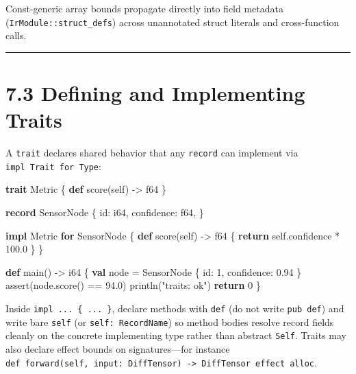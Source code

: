 \documentclass[
  english,
  oneside]{book}
\newenvironment{Shaded}{\begin{snugshade}}{\end{snugshade}}
\newcommand{\ControlFlowTok}[1]{\textcolor[rgb]{0.77,0.53,0.75}{\textbf{#1}}}
\newcommand{\DataTypeTok}[1]{\textcolor[rgb]{0.31,0.79,0.69}{#1}}
\newcommand{\DecValTok}[1]{\textcolor[rgb]{0.71,0.81,0.66}{#1}}
\newcommand{\FloatTok}[1]{\textcolor[rgb]{0.71,0.81,0.66}{#1}}
\newcommand{\FunctionTok}[1]{\textcolor[rgb]{0.86,0.86,0.67}{#1}}
\newcommand{\KeywordTok}[1]{\textcolor[rgb]{0.34,0.61,0.84}{\textbf{#1}}}
\newcommand{\NormalTok}[1]{\textcolor[rgb]{0.83,0.83,0.83}{#1}}
\newcommand{\OperatorTok}[1]{\textcolor[rgb]{0.83,0.83,0.83}{#1}}
\newcommand{\StringTok}[1]{\textcolor[rgb]{0.81,0.57,0.47}{#1}}
\begin{document}
Const-generic array bounds propagate directly into field metadata
(\texttt{IrModule::struct\_defs}) across unannotated struct literals and
cross-function calls.

\begin{center}\rule{0.5\linewidth}{0.5pt}\end{center}

\section{7.3 Defining and Implementing
Traits}\label{defining-and-implementing-traits}

A \texttt{trait} declares shared behavior that any \texttt{record} can
implement via \texttt{impl\ Trait\ for\ Type}:

\begin{Shaded}
\begin{Highlighting}[]
\KeywordTok{trait}\NormalTok{ Metric \{}
    \KeywordTok{def}\NormalTok{ score(self) }\OperatorTok{{-}\textgreater{}} \DataTypeTok{f64}
\NormalTok{\}}

\KeywordTok{record}\NormalTok{ SensorNode \{}
\NormalTok{    id: }\DataTypeTok{i64}\NormalTok{,}
\NormalTok{    confidence: }\DataTypeTok{f64}\NormalTok{,}
\NormalTok{\}}

\KeywordTok{impl}\NormalTok{ Metric }\ControlFlowTok{for}\NormalTok{ SensorNode \{}
    \KeywordTok{def}\NormalTok{ score(self) }\OperatorTok{{-}\textgreater{}} \DataTypeTok{f64}\NormalTok{ \{}
        \ControlFlowTok{return}\NormalTok{ self}\OperatorTok{.}\NormalTok{confidence }\OperatorTok{*} \FloatTok{100.0}
\NormalTok{    \}}
\NormalTok{\}}

\KeywordTok{def}\NormalTok{ main() }\OperatorTok{{-}\textgreater{}} \DataTypeTok{i64}\NormalTok{ \{}
    \KeywordTok{val}\NormalTok{ node }\OperatorTok{=}\NormalTok{ SensorNode \{ id: }\DecValTok{1}\NormalTok{, confidence: }\FloatTok{0.94}\NormalTok{ \}}
    \FunctionTok{assert}\NormalTok{(node}\OperatorTok{.}\NormalTok{score() }\OperatorTok{==} \FloatTok{94.0}\NormalTok{)}
\NormalTok{    println(}\StringTok{"traits: ok"}\NormalTok{)}
    \ControlFlowTok{return} \DecValTok{0}
\NormalTok{\}}
\end{Highlighting}
\end{Shaded}

Inside \texttt{impl\ ...\ \{\ ...\ \}}, declare methods with
\texttt{def} (do not write \texttt{pub\ def}) and write bare
\texttt{self} (or \texttt{self:\ RecordName}) so method bodies resolve
record fields cleanly on the concrete implementing type rather than
abstract \texttt{Self}. Traits may also declare effect bounds on
signatures---for instance
\texttt{def\ forward(self,\ input:\ DiffTensor)\ -\textgreater{}\ DiffTensor\ effect\ alloc}.
\end{document}
